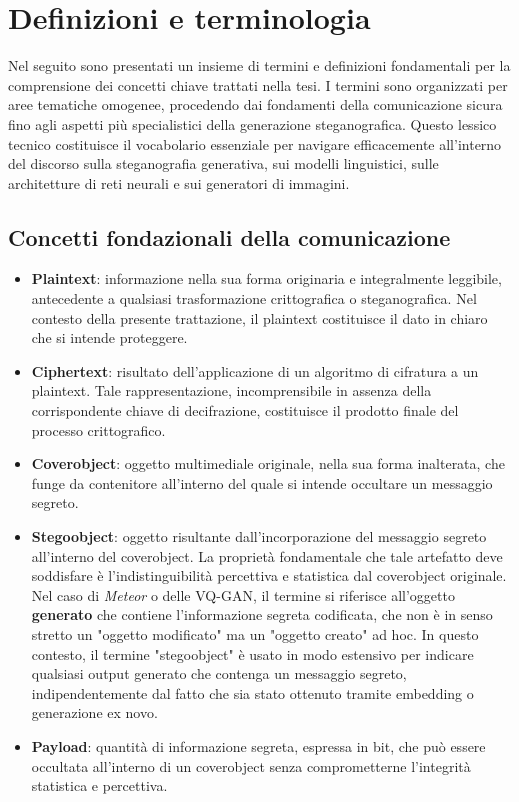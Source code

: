 
\chapter{Definizioni e terminologia}
\label{ch:definizioni}

Nel seguito sono presentati un insieme di termini e definizioni fondamentali per la comprensione dei concetti chiave trattati nella tesi. I termini sono organizzati per aree tematiche omogenee, procedendo dai fondamenti della comunicazione sicura fino agli aspetti più specialistici della generazione steganografica. Questo lessico tecnico costituisce il vocabolario essenziale per navigare efficacemente all'interno del discorso sulla steganografia generativa, sui modelli linguistici, sulle architetture di reti neurali e sui generatori di immagini.

\section{Concetti fondazionali della comunicazione}
\begin{itemize}
	\item \textbf{Plaintext}: informazione nella sua forma originaria e integralmente leggibile, antecedente a qualsiasi trasformazione crittografica o steganografica. Nel contesto della presente trattazione, il plaintext costituisce il dato in chiaro che si intende proteggere.
	\item \textbf{Ciphertext}: risultato dell'applicazione di un algoritmo di cifratura a un plaintext. Tale rappresentazione, incomprensibile in assenza della corrispondente chiave di decifrazione, costituisce il prodotto finale del processo crittografico.
	\item \textbf{Coverobject}: oggetto multimediale originale, nella sua forma inalterata, che funge da contenitore all'interno del quale si intende occultare un messaggio segreto.
	\item \textbf{Stegoobject}: oggetto risultante dall'incorporazione del messaggio segreto all'interno del coverobject. La proprietà fondamentale che tale artefatto deve soddisfare è l'indistinguibilità percettiva e statistica dal coverobject originale. Nel caso di \emph{Meteor} o delle VQ-GAN, il termine si riferisce all'oggetto \textbf{generato} che contiene l'informazione segreta codificata, che non è in senso stretto un "oggetto modificato" ma un "oggetto creato" ad hoc. In questo contesto, il termine "stegoobject" è usato in modo estensivo per indicare qualsiasi output generato che contenga un messaggio segreto, indipendentemente dal fatto che sia stato ottenuto tramite embedding o generazione ex novo.
	\item \textbf{Payload}: quantità di informazione segreta, espressa in bit, che può essere occultata all'interno di un coverobject senza comprometterne l'integrità statistica e percettiva.
\end{itemize}

